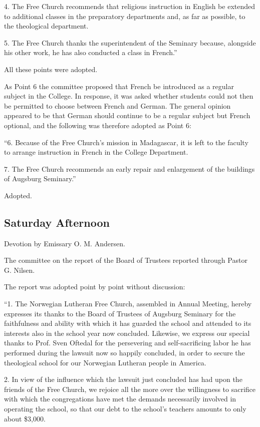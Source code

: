 4. The Free Church recommends that religious instruction in English be extended to additional classes in the preparatory departments and, as far as possible, to the theological department.

5. The Free Church thanks the superintendent of the Seminary because, alongside his other work, he has also conducted a class in French.”

All these points were adopted.

As Point 6 the committee proposed that French be introduced as a regular subject in the College. In response, it was asked whether students could not then be permitted to choose between French and German. The general opinion appeared to be that German should continue to be a regular subject but French optional, and the following was therefore adopted as Point 6:

“6. Because of the Free Church’s mission in Madagascar, it is left to the faculty to arrange instruction in French in the College Department.

7. The Free Church recommends an early repair and enlargement of the buildings of Augsburg Seminary.”

Adopted.

\subsection{Saturday Afternoon}

Devotion by Emissary O. M. Andersen.

The committee on the report of the Board of Trustees reported through Pastor G. Nilsen.

The report was adopted point by point without discussion:

“1. The Norwegian Lutheran Free Church, assembled in Annual Meeting, hereby expresses its thanks to the Board of Trustees of Augsburg Seminary for the faithfulness and ability with which it has guarded the school and attended to its interests also in the school year now concluded. Likewise, we express our special thanks to Prof. Sven Oftedal for the persevering and self-sacrificing labor he has performed during the lawsuit now so happily concluded, in order to secure the theological school for our Norwegian Lutheran people in America.

2. In view of the influence which the lawsuit just concluded has had upon the friends of the Free Church, we rejoice all the more over the willingness to sacrifice with which the congregations have met the demands necessarily involved in operating the school, so that our debt to the school’s teachers amounts to only about \$3,000.

